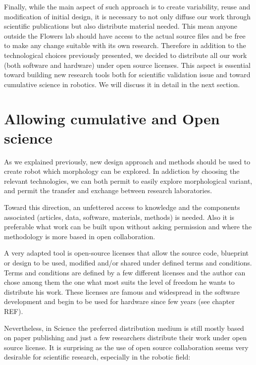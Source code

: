 Finally, while the main aspect of such approach is to create variability, reuse and modification of initial design, it is necessary to not only diffuse our work through scientific publications but also distribute material needed.
This mean anyone outside the Flowers lab should have access to the actual source files and be free to make any change suitable with its own research. Therefore in addition to the technological choices previously presented, we decided to distribute all our work (both software and hardware) under open source licenses.
This aspect is essential toward building new research tools both for scientific validation issue and toward cumulative science in robotics. We will discuss it in detail in the next section.


\section{Allowing cumulative and Open science} %

As we explained previously, new design approach and methods should be used to create robot which morphology can be explored. In addiction by choosing the relevant technologies, we can both permit to easily explore morphological variant, and permit the transfer and exchange between research laboratories.

Toward this direction, an unfettered access to knowledge and the components associated (articles, data, software, materials, methods) is needed. Also it is preferable what work can be built upon without asking permission and where the methodology is more based in open collaboration.

A very adapted tool is open-source licenses that allow the source code, blueprint or design to be used, modified and/or shared under defined terms and conditions. Terms and conditions are defined by a few different licenses and the author can chose among them the one what most suits the level of freedom he wants to distribute his work. These licenses are famous and widespread in the software development and begin to be used for hardware since few years (see chapter REF).

Nevertheless, in Science the preferred distribution medium is still mostly based on paper publishing and just a few researchers distribute their work under open source license. It is surprising as the use of open source collaboration seems very desirable for scientific research, especially in the robotic field:

